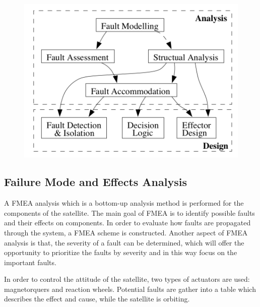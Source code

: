 \begin{table}[H]
\begin{minipage}[b]{0.49\linewidth}
\begin{figure}[H]
			\includegraphics[width=1\linewidth]{figures/FTC_2}
			\caption{ }
			\label{fig:2}
		\end{figure}
	\end{minipage}
\end{table}
\subsection{Failure Mode and Effects Analysis}


A FMEA analysis which is a bottom-up analysis method is performed for the components of the satellite. The main goal of FMEA is to identify possible faults and their effects on components. In order to evaluate how faults are propagated through the system, a FMEA scheme is constructed.
Another aspect of FMEA analysis is that, the severity of a fault can be determined, which will offer the opportunity to prioritize the faults by severity and in this way focus on the important faults.

In order to control the attitude of the satellite, two types of actuators are used: magnetorquers and reaction wheels. Potential faults are gather into a table which describes the effect and cause, while the satellite is orbiting.

